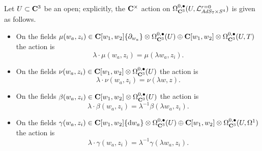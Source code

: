 \documentclass[../main.tex]{subfiles}
\begin{document}
%
%
%
%

Let $U\subset \mathbf{C}^3$ be an open; explicitly, the $\mathbf{C}^\times$ action on $\Omega^{0,\bullet}_{\mathbf{C}^3} (U, \mathcal{L}^{{r=0}}_{AdS_7\times S^4} )$ is given as follows.
\begin{itemize}
\item On the fields $\mu(w_a,z_i) \in \mathbf{C}[w_1, w_2]\{\partial_{w_a}\} \otimes \Omega^{0,\bullet}_{\mathbf{C}^3} (U) \oplus \mathbf{C}[w_1, w_2]\otimes \Omega^{0,\bullet}_{\mathbf{C}^3}(U, T)$ the action is
\[
\lambda \cdot \mu(w_a,z_i) = \mu(\lambda w_a , z_i).
\]
\item On the fields $\nu(w_a,z_i) \in \mathbf{C}[w_1, w_2] \otimes \Omega^{0,\bullet}_{\mathbf{C}^3}(U)$ the action is
\[
\lambda \cdot \nu(w_a,z_i) = \nu(\lambda w , z).
\]
\item On the fields $\beta(w_a,z_i) \in \mathbf{C}[w_1, w_2] \otimes \Omega^{0,\bullet}_{\mathbf{C}^3}(U)$ the action is
\[
\lambda \cdot \beta(w_a,z_i) = \lambda^{-1} \beta(\lambda w_a , z_i).
\]
\item On the fields $\gamma(w_a,z_i) \in \mathbf{C}[w_1, w_2] \{\mathrm{d} w_a\} \otimes \Omega^{0,\bullet}_{\mathbf{C}^3} (U) \oplus \mathbf{C}[w_1, w_2]\otimes \Omega^{0,\bullet}_{\mathbf{C}^3}(U, \Omega^1)$ the action is
\[
\lambda \cdot \gamma(w_a,z_i) = \lambda^{-1} \gamma(\lambda w _a, z_i).
\]
\end{itemize}
\end{document}
